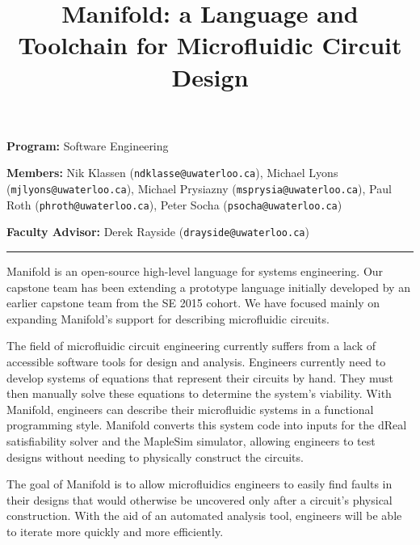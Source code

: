 \documentclass[12pt]{article}
\title{Manifold: a Language and Toolchain for Microfluidic Circuit Design}
\date{\vspace{-10ex}}
\begin{document}
\maketitle

{\bf Program:} Software Engineering

{\bf Members:} Nik Klassen ({\tt ndklasse@uwaterloo.ca}), Michael Lyons ({\tt mjlyons@uwaterloo.ca}), Michael Prysiazny ({\tt msprysia@uwaterloo.ca}), Paul Roth ({\tt phroth@uwaterloo.ca}), Peter Socha ({\tt psocha@uwaterloo.ca})

{\bf Faculty Advisor:} Derek Rayside ({\tt drayside@uwaterloo.ca})

\rule{\textwidth}{1pt}



Manifold is an open-source high-level language for systems engineering.
Our capstone team has been extending a prototype language initially developed by an earlier capstone team from the SE 2015 cohort.
We have focused mainly on expanding Manifold's support for describing microfluidic circuits.

The field of microfluidic circuit engineering currently suffers from a lack of accessible software tools for design and analysis.
Engineers currently need to develop systems of equations that represent their circuits by hand.
They must then manually solve these equations to determine the system's viability.
With Manifold, engineers can describe their microfluidic systems in a functional programming style.
Manifold converts this system code into inputs for the dReal satisfiability solver and the MapleSim simulator, allowing engineers to test designs without needing to physically construct the circuits.

The goal of Manifold is to allow microfluidics engineers to easily find faults in their designs that would otherwise be uncovered only after a circuit's physical construction.
With the aid of an automated analysis tool, engineers will be able to iterate more quickly and more efficiently.

\end{document}
